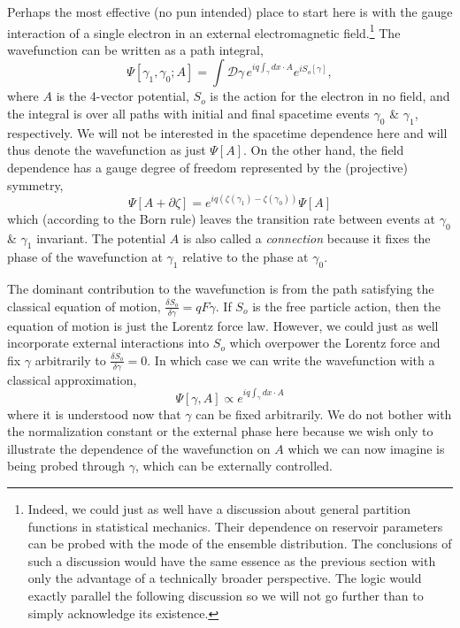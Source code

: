 \documentclass[pra, 10pt, notitlepage, twocolumn]{revtex4-1}
\begin{document}
Perhaps the most effective (no pun intended) place to start here is with the gauge interaction of a single electron in an external electromagnetic field.\footnote{Indeed, we could just as well have a discussion about general partition functions in statistical mechanics.
Their dependence on reservoir parameters can be probed with the mode of the ensemble distribution.
The conclusions of such a discussion would have the same essence as the previous section with only the advantage of a technically broader perspective.
The logic would exactly parallel the following discussion so we will not go further than to simply acknowledge its existence.}
The wavefunction can be written as a path integral,
\begin{equation}\label{avgWilson}
	\Psi[\gamma_1,\gamma_0;A] = \int\!\!\mathcal{D}\gamma\, e^{iq\!\int_\gamma \!dx\cdot A}e^{iS_o[\gamma]},
\end{equation}
where $A$ is the 4-vector potential, $S_o$ is the action for the electron in no field,
and the integral is over all paths with initial and final spacetime events $\gamma_0$ \& $\gamma_1$, respectively.
We will not be interested in the spacetime dependence here and will thus denote the wavefunction as just $\Psi[A]$.
On the other hand, the field dependence has a gauge degree of freedom represented by the (projective) symmetry,
\begin{equation}
	\Psi[A+\partial\zeta] = e^{iq(\zeta(\gamma_1)-\zeta(\gamma_0))}\Psi[A]
\end{equation}
which (according to the Born rule) leaves the transition rate between events at $\gamma_0$ \& $\gamma_1$ invariant.
The potential $A$ is also called a \emph{connection} because it fixes the phase of the wavefunction at $\gamma_1$ relative to the phase at $\gamma_0$.

The dominant contribution to the wavefunction is from the path satisfying the classical equation of motion, $\frac{\delta S_o}{\delta \gamma}=qF\dot\gamma$.
If $S_o$ is the free particle action, then the equation of motion is just the Lorentz force law.
However, we could just as well incorporate external interactions into $S_o$ which overpower the Lorentz force and fix $\gamma$ arbitrarily to $\frac{\delta S_o}{\delta \gamma}=0$.
In which case we can write the wavefunction with a classical approximation,
\begin{equation}
	\Psi[\gamma,A] \propto e^{iq\!\int_\gamma \!dx\cdot A}
\end{equation}
where it is understood now that $\gamma$ can be fixed arbitrarily.
We do not bother with the normalization constant or the external phase here because we wish only to illustrate the dependence of the wavefunction on $A$ which we can now imagine is being probed through $\gamma$, which can be externally controlled.
\end{document}
